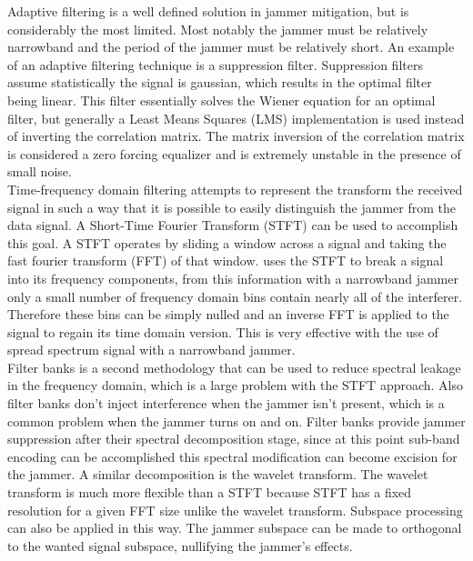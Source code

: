 \documentclass[11pt]{mvlthesis}
\begin{document}
Adaptive filtering is a well defined solution in jammer mitigation, but is considerably the most limited.  Most notably the jammer must be relatively narrowband and the period of the jammer must be relatively short.  An example of an adaptive filtering technique is a suppression filter.  Suppression filters assume statistically the signal is gaussian, which results in the optimal filter being linear.  This filter essentially solves the Wiener equation for an optimal filter, but generally a Least Means Squares (LMS) implementation is used instead of inverting the correlation matrix\cite{11}. The matrix inversion of the correlation matrix is considered a zero forcing equalizer and is extremely unstable in the presence of small noise.\\


Time-frequency domain filtering attempts to represent the transform the received signal in such a way that it is possible to easily distinguish the jammer from the data signal.  A Short-Time Fourier Transform (STFT) can be used to accomplish this goal.  A STFT operates by sliding a window across a signal and taking the fast fourier transform (FFT) of that window.  \cite{12} uses the STFT to break a signal into its frequency components, from this information with a narrowband jammer only a small number of frequency domain bins contain nearly all of the interferer.  Therefore these bins can be simply nulled and an inverse FFT is applied to the signal to regain its time domain version.  This is very effective with the use of spread spectrum signal with a narrowband jammer.\\

%
%

Filter banks is a second methodology that can be used to reduce spectral leakage in the frequency domain, which is a large problem with the STFT approach.  Also filter banks don't inject interference when the jammer isn't present, which is a common problem when the jammer turns on and on.  Filter banks provide jammer suppression after their spectral decomposition stage, since at this point sub-band encoding can be accomplished this spectral modification can become excision for the jammer\cite{13}.  A similar decomposition is the wavelet transform.  The wavelet transform is much more flexible than a STFT because STFT has a fixed resolution for a given FFT size unlike the wavelet transform.  Subspace processing can also be applied in this way.  The jammer subspace can be made to orthogonal to the wanted signal subspace, nullifying the jammer's effects\cite{14}.\\
\end{document}
